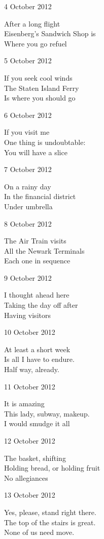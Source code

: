 \documentclass[12pt]{article}
\begin{document}
\newpage

4 October 2012

After a long flight \\
Eisenberg's Sandwich Shop is \\
Where you go refuel

5 October 2012

If you seek cool winds \\
The Staten Island Ferry \\
Is where you should go

6 October 2012

If you visit me \\
One thing is undoubtable: \\
You will have a slice

7 October 2012

On a rainy day \\
In the financial district \\
Under umbrella

8 October 2012

The Air Train visits \\
All the Newark Terminals \\
Each one in sequence

9 October 2012

I thought ahead here \\
Taking the day off after \\
Having visitors

10 October 2012

At least a short week \\
Is all I have to endure. \\
Half way, already.

\newpage

11 October 2012 

It is amazing \\
This lady, subway, makeup. \\
I would smudge it all

12 October 2012

The basket, shifting \\
Holding bread, or holding fruit \\
No allegiances

13 October 2012

Yes, please, stand right there. \\
The top of the stairs is great. \\
None of us need move.
\end{document}
